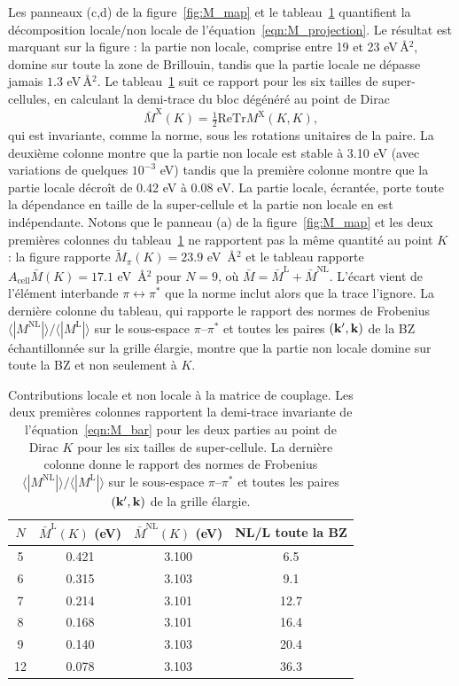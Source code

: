 Les panneaux (c,d) de la figure~\ref{fig:M_map} et le tableau~\ref{tab:L_NL} quantifient la décomposition locale/non locale de l'équation~\eqref{eqn:M_projection}. Le résultat est marquant sur la figure : la partie non locale, comprise entre 19 et 23 eV\,\AA$^2$, domine sur toute la zone de Brillouin, tandis que la partie locale ne dépasse jamais $1.3$ eV\,\AA$^2$. Le tableau~\ref{tab:L_NL}
suit ce rapport pour les six tailles de super-cellules, en calculant la demi-trace du bloc dégénéré au point de Dirac
\begin{equation}
    \bar M^\text{X}(K) = \tfrac{1}{2}\mathrm{Re}\mathrm{Tr}M^\text{X}(K,K),\label{eqn:M_bar}
\end{equation}
qui est invariante, comme la norme, sous les rotations unitaires de la paire. La deuxième colonne montre que la partie non locale est stable à 3.10 eV (avec variations de quelques $10^{-3}$ eV) tandis que la première colonne montre que la partie locale décroît de 0.42 eV à 0.08 eV. La partie locale, écrantée, porte toute la dépendance en taille de la super-cellule et la partie non locale en est indépendante. Notons que le panneau (a) de la figure~\ref{fig:M_map} et les deux premières colonnes du tableau~\ref{tab:L_NL} ne rapportent pas la même quantité au point $K$ : la figure rapporte $ \tilde M_\pi(K)=23.9$ eV~\AA$^2$ et le tableau rapporte $A_\text{cell}\bar M(K)=17.1$ eV~\AA$^2$ pour $N=9$, où $\bar M = \bar M^\text{L}+\bar M^\text{NL}$. L'écart vient de l'élément interbande $\pi\leftrightarrow\pi^*$ que la norme inclut alors que la trace l'ignore. La dernière colonne du tableau, qui rapporte le rapport des normes de Frobenius $\langle |M^\text{NL}|\rangle/\langle |M^\text{L}|\rangle$ sur le sous-espace $\pi$--$\pi^*$ et toutes les paires $(\mathbf{k}',\mathbf{k})$ de la BZ échantillonnée sur la grille élargie, montre que la partie non locale domine sur toute la BZ et non seulement à $K$.
\begin{table}[htbp]
    \centering
    \caption[Contributions locale et non locale
     à la matrice de couplage électron-défaut.]{Contributions locale et non locale à la matrice de couplage. Les deux premières colonnes rapportent la demi-trace invariante de l'équation~\eqref{eqn:M_bar} pour les deux parties au point de Dirac $K$ pour les six tailles de super-cellule. La dernière colonne donne le rapport des normes de Frobenius $\langle |M^\text{NL}|\rangle/\langle |M^\text{L}|\rangle$ sur le sous-espace $\pi$--$\pi^*$ et toutes les paires $(\mathbf{k}',\mathbf{k})$ de la grille élargie.}
    \label{tab:L_NL}
    \begin{tabular}{c c c c}
        \hline\hline
        $N$ & $\bar M^\text{L}(K)$ (eV) & $\bar M^\text{NL}(K)$ (eV) & NL/L toute la BZ \\
        \hline
        5  & 0.421 & 3.100 & 6.5 \\
        6  & 0.315 & 3.103 & 9.1 \\
        7  & 0.214 & 3.101 & 12.7 \\
        8  & 0.168 & 3.101 & 16.4 \\
        9  & 0.140 & 3.103 & 20.4 \\
        12 & 0.078 & 3.103 & 36.3 \\
        \hline\hline
    \end{tabular}
\end{table}
